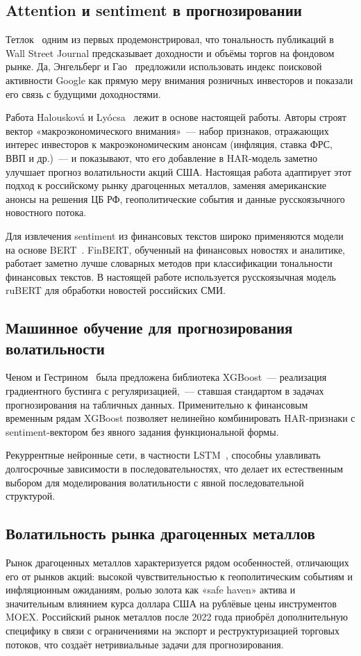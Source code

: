 \subsection{Attention и sentiment в прогнозировании}

Тетлок~\cite{Tetlock2007} одним из первых продемонстрировал, что тональность
публикаций в Wall Street Journal предсказывает доходности и объёмы торгов на фондовом рынке.
Да, Энгельберг и Гао~\cite{Da2011} предложили использовать индекс поисковой активности Google
как прямую меру внимания розничных инвесторов и показали его связь с будущими доходностями.

Работа Halousková и Lyócsa~\cite{Halouskova2025} лежит в основе настоящей работы.
Авторы строят вектор «макроэкономического внимания»~--- набор признаков,
отражающих интерес инвесторов к макроэкономическим анонсам (инфляция, ставка ФРС,
ВВП и др.)~--- и показывают, что его добавление в HAR-модель заметно улучшает
прогноз волатильности акций США.
Настоящая работа адаптирует этот подход к российскому рынку драгоценных металлов,
заменяя американские анонсы на решения ЦБ РФ, геополитические события
и данные русскоязычного новостного потока.

Для извлечения sentiment из финансовых текстов широко применяются
модели на основе BERT~\cite{Araci2019}.
FinBERT, обученный на финансовых новостях и аналитике,
работает заметно лучше словарных методов
при классификации тональности финансовых текстов.
В настоящей работе используется русскоязычная модель ruBERT
для обработки новостей российских СМИ.

\subsection{Машинное обучение для прогнозирования волатильности}

Ченом и Гестрином~\cite{Chen2016} была предложена библиотека XGBoost~---
реализация градиентного бустинга с регуляризацией,~--- ставшая стандартом
в задачах прогнозирования на табличных данных.
Применительно к финансовым временным рядам XGBoost позволяет нелинейно
комбинировать HAR-признаки с sentiment-вектором без явного задания функциональной формы.

Рекуррентные нейронные сети, в частности LSTM~\cite{Hochreiter1997},
способны улавливать долгосрочные зависимости в последовательностях,
что делает их естественным выбором для моделирования волатильности
с явной последовательной структурой.

\subsection{Волатильность рынка драгоценных металлов}

Рынок драгоценных металлов характеризуется рядом особенностей,
отличающих его от рынков акций:
высокой чувствительностью к геополитическим событиям и инфляционным ожиданиям,
ролью золота как «safe haven» актива и значительным влиянием
курса доллара США на рублёвые цены инструментов MOEX.
Российский рынок металлов после 2022 года приобрёл дополнительную специфику
в связи с ограничениями на экспорт и реструктуризацией торговых потоков,
что создаёт нетривиальные задачи для прогнозирования.
